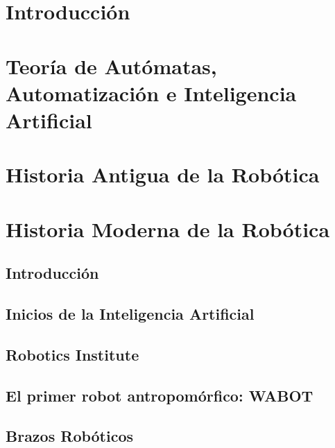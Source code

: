 \documentclass[a4paper,11pt]{article}
\begin{document}
\tableofcontents

\newpage

\section{Introducción}


\newpage

\section{Teoría de Autómatas, Automatización e Inteligencia Artificial}


\newpage

\section{Historia Antigua de la Robótica}


\newpage

\section{Historia Moderna de la Robótica}

\subsection{Introducción}


\subsection{Inicios de la Inteligencia Artificial}


\subsection{Robotics Institute}


\subsection{El primer robot antropomórfico: WABOT}


\subsection{Brazos Robóticos}

\end{document}
